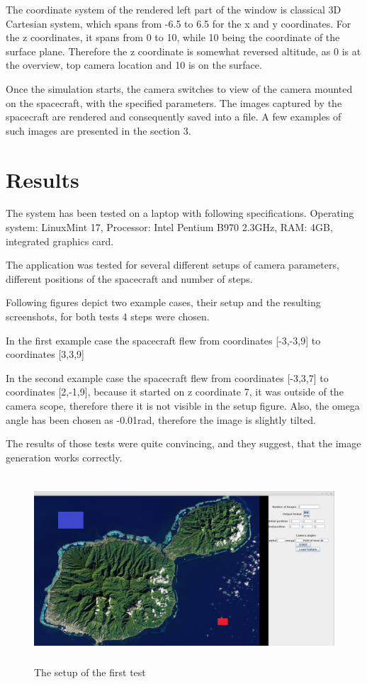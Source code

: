 \documentclass[english,12pt,a4paper,pdftex,elec,utf8]{aaltothesis}
\begin{document}
The coordinate system of the rendered left part of the window is classical 3D Cartesian system, which spans from -6.5 to 6.5 for the x and y coordinates. For the z coordinates, it spans from 0 to 10, while 10 being the coordinate of the surface plane. Therefore the z coordinate is somewhat reversed altitude, as 0 is at the overview, top camera location and 10 is on the surface. 

Once the simulation starts, the camera switches to view of the camera mounted on the spacecraft, with the specified parameters. The images captured by the spacecraft are rendered and consequently saved into a file. A few examples of such images are presented in the section 3.

\clearpage

\section{Results}

The system has been tested on a laptop with following specifications. Operating system: LinuxMint 17, Processor: Intel Pentium B970 2.3GHz, RAM: 4GB, integrated graphics card.

The application was tested for several different setups of camera parameters, different positions of the spacecraft and number of steps. 

Following figures depict two example cases, their setup and the resulting screenshots, for both tests 4 steps were chosen.

In the first example case the spacecraft flew from coordinates [-3,-3,9] to coordinates [3,3,9]

In the second example case the spacecraft flew from coordinates [-3,3,7] to coordinates [2,-1,9], because it started on z coordinate 7, it was outside of the camera scope, therefore there it is not visible in the setup figure.
Also, the omega angle has been chosen as -0.01rad, therefore the image is slightly tilted.

The results of those tests were quite convincing, and they suggest, that the image generation works correctly.

\begin{figure}[htb]
\centering \includegraphics[height=7cm]{screenTest1.png}
\caption{The setup of the first test\label{screenTest1}}
\end{figure}
\end{document}
